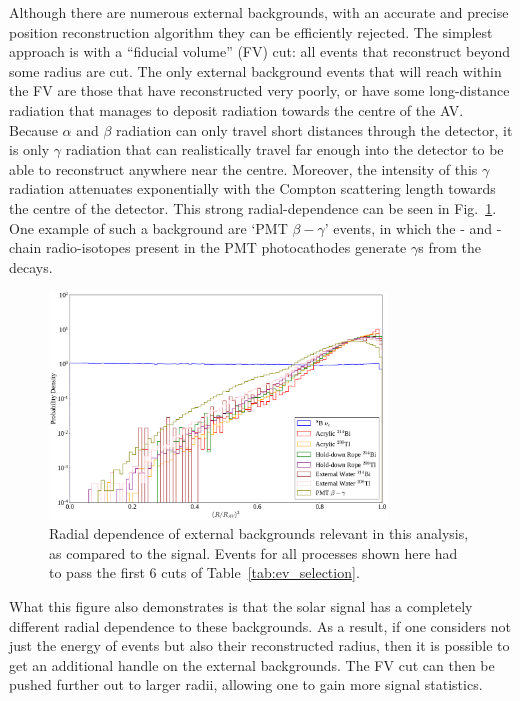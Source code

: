 Although there are numerous external backgrounds, with an accurate and precise position reconstruction algorithm they can be efficiently rejected. The simplest approach is with a ``fiducial volume'' (FV) cut: all events that reconstruct beyond some radius are cut. The only external background events that will reach within the FV are those that have reconstructed very poorly, or have some long-distance radiation that manages to deposit radiation towards the centre of the AV. %
Because $\alpha$ and $\beta$ radiation can only travel short distances through the detector, it is only $\gamma$ %
radiation that can realistically travel far enough into the detector to be able to reconstruct anywhere near the centre. Moreover, the intensity of this $\gamma$ radiation attenuates exponentially with the Compton scattering length towards the centre of the detector. This strong radial-dependence can be seen in Fig.~\ref{fig:external_radial_dependence}. One example of such a background are `PMT $\beta-\gamma$' events, in which the - and -chain radio-isotopes present in the PMT photocathodes generate $\gamma$s from the decays.

\begin{figure}
    \centering
    \includegraphics[width=0.8\textwidth]{6_SolarAnalysis/images/externals_radial_plot.pdf}
    \caption[Radial dependence of external backgrounds relevant in this analysis, as compared to the \beight{} signal]
    {Radial dependence of external backgrounds relevant in this analysis, as compared to the \beight{} signal. Events for all processes shown here had to pass the first 6 cuts of Table~\ref{tab:ev_selection}.}
    \label{fig:external_radial_dependence}
\end{figure}

What this figure also demonstrates is that the solar signal has a completely different radial dependence to these backgrounds. As a result, if one considers not just the energy of events but also their reconstructed radius, then it is possible to get an additional handle on the external backgrounds. The FV cut can then be pushed further out to larger radii, allowing one to gain more signal statistics.

